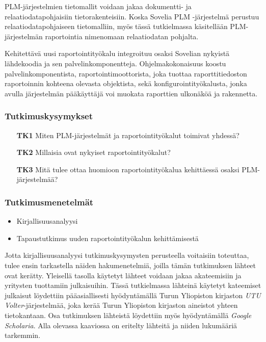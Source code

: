 PLM-järjestelmien tietomallit voidaan jakaa dokumentti- ja relaatiodatapohjaisiin tietorakenteisiin. \cite{david_what_2016} Koska Sovelia PLM -järjestelmä perustuu relaatiodatapohjaiseen tietomalliin, myös tässä tutkielmassa käsitellään PLM-järjestelmän raportointia nimenomaan relaatiodatan pohjalta.

Kehitettävä uusi raportointityökalu integroituu osaksi Sovelian nykyistä lähdekoodia ja sen palvelinkomponentteja. Ohjelmakokonaisuus koostu palvelinkomponentista, raportointimoottorista, joka tuottaa raporttitiedoston raportoinnin kohteena olevasta objektista, sekä konfigurointityökalusta, jonka avulla järjestelmän pääkäyttäjä voi muokata raporttien ulkonäköä ja rakennetta.

\subsubsection{Tutkimuskysymykset}
\begin{itemize}
\item[\textbf{TK1}] Miten PLM-järjestelmät ja raportointityökalut toimivat yhdessä?
\item[\textbf{TK2}] Millaisia ovat nykyiset raportointityökalut?
\item[\textbf{TK3}] Mitä tulee ottaa huomioon raportointityökalua kehittäessä osaksi PLM-järjestelmää?
\end{itemize}

\subsubsection{Tutkimusmenetelmät}
\begin{itemize}
\item Kirjallisuusanalyysi
\item Tapaustutkimus uuden raportointityökalun kehittämisestä
\end{itemize}

Jotta kirjallisuusanalyysi tutkimuskysymysten perusteella voitaisiin toteuttaa, tulee ensin tarkastella näiden hakumenetelmiä, joilla tämän tutkimuksen lähteet ovat kerätty. Yleisellä tasolla käytetyt lähteet voidaan jakaa akateemisiin ja yritysten tuottamiin julkaisuihin. Tässä tutkielmassa lähteinä käytetyt kateemiset julkaisut löydettiin pääasiallisesti hyödyntämällä Turun Yliopiston kirjaston \textit{UTU Volter}-järjestelmää, joka kerää Turun Yliopiston kirjaston aineistot yhteen tietokantaan. Osa tutkimuksen lähteistä löydettiin myös hyödyntämällä \textit{Google Scholaria}. Alla olevassa kaaviossa on eritelty lähteitä ja niiden lukumääriä tarkemmin.

